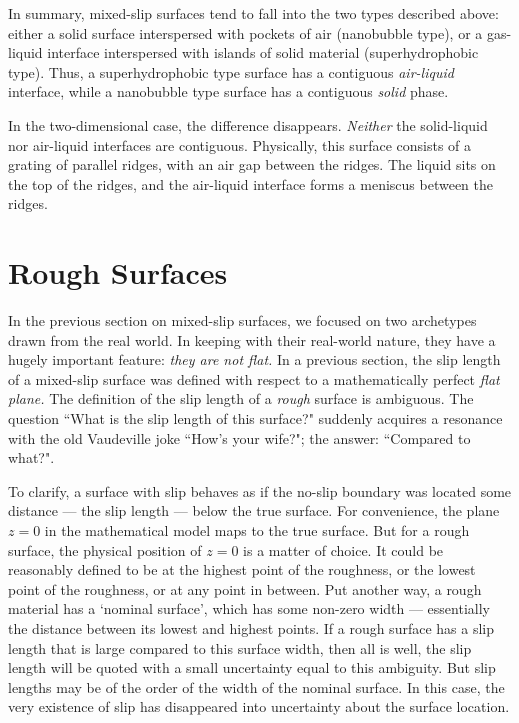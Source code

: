 \documentclass[12pt, a4paper, twoside, openright]{book}
\begin{document}
\vspace*{1em}
In summary, mixed-slip surfaces tend to fall into the two types described above: either a solid surface interspersed with pockets of air (nanobubble type), or a gas-liquid interface interspersed with islands of solid material (superhydrophobic type).  Thus, a superhydrophobic type surface has a contiguous \emph{air-liquid} interface, while a nanobubble type surface has a contiguous \emph{solid} phase.

In the two-dimensional case, the difference disappears.  \emph{Neither} the solid-liquid nor air-liquid interfaces are contiguous.  Physically, this surface consists of a grating of parallel ridges, with an air gap between the ridges.  The liquid sits on the top of the ridges, and the air-liquid interface forms a meniscus between the ridges.


\section{Rough Surfaces}

In the previous section on mixed-slip surfaces, we focused on two archetypes drawn from the real world.  In keeping with their real-world nature, they have a hugely important feature: \emph{they are not flat.}  In a previous section, the slip length of a mixed-slip surface was defined with respect to a mathematically perfect \emph{flat plane.}  The definition of the slip length of a \emph{rough} surface is ambiguous.  The question ``What is the slip length of this surface?" suddenly acquires a resonance with the old Vaudeville joke ``How's your wife?";  the answer: ``Compared to what?".

To clarify, a surface with slip behaves as if the no-slip boundary was located some distance --- the slip length --- below the true surface.  For convenience, the plane $z=0$ in the mathematical model maps to the true surface. But for a rough surface, the physical position of $z=0$ is a matter of choice.  It could be reasonably defined to be at the highest point of the roughness, or the lowest point of the roughness, or at any point in between.  Put another way, a rough material has a  `nominal surface', which has some non-zero width --- essentially the distance between its lowest and highest points.  If a rough surface has a slip length that is  large compared to this surface width, then all is well, the slip length will be quoted with a small uncertainty equal to this ambiguity.  But slip lengths may be of the order of the width of the nominal surface.  In this case, the very existence of slip has disappeared into uncertainty about the surface location.
\end{document}
